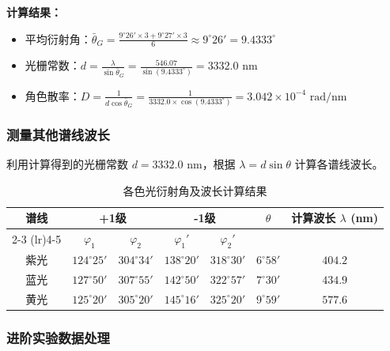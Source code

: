 \documentclass[]{../../templates/Report}%
\begin{document}
\begin{fullreportonly}
\textbf{计算结果：}
\begin{itemize}
    \item 平均衍射角：$\bar{\theta}_G =\frac{9^\circ 26'\times 3 + 9^\circ 27' \times 3}{6} \approx 9^\circ 26' = 9.4333^\circ$
    \item 光栅常数：$d = \frac{\lambda}{\sin \bar{\theta}_G} = \frac{546.07}{\sin(9.4333^\circ)} = 3332.0 \text{ nm}$
    \item 角色散率：$D = \frac{1}{d \cos \bar{\theta}_G} = \frac{1}{3332.0 \times \cos(9.4333^\circ)} = 3.042 \times 10^{-4} \text{ rad/nm}$
\end{itemize}

\subsubsection{测量其他谱线波长}
利用计算得到的光栅常数 $d = 3332.0 \text{ nm}$，根据 $\lambda = d \sin \theta$ 计算各谱线波长。

\begin{table}[H]
    \centering
    \caption{各色光衍射角及波长计算结果}
    \begin{tabular}{ccccccc}
        \toprule
        \multirow{2}{*}{谱线} & \multicolumn{2}{c}{+1级} & \multicolumn{2}{c}{-1级} & \multirow{2}{*}{$\theta$} & \multirow{2}{*}{计算波长 $\lambda$ (nm)} \\
        \cmidrule(lr){2-3} \cmidrule(lr){4-5}
         & $\varphi_1$ & $\varphi_2$ & $\varphi_1'$ & $\varphi_2'$ & & \\
        \midrule
        紫光 & $124^\circ 25'$ & $304^\circ 34'$ & $138^\circ 20'$ & $318^\circ 30'$ & $6^\circ 58'$ & $404.2$ \\
        蓝光 & $127^\circ 50'$ & $307^\circ 55'$ & $142^\circ 50'$ & $322^\circ 57'$ & $7^\circ 30'$ & $434.9$ \\
        黄光 & $125^\circ 20'$ & $305^\circ 20'$ & $145^\circ 16'$ & $325^\circ 20'$ & $9^\circ 59'$ & $577.6$ \\
        \bottomrule
    \end{tabular}
\end{table}


\subsubsection{进阶实验数据处理}


\end{fullreportonly}
\end{document}
